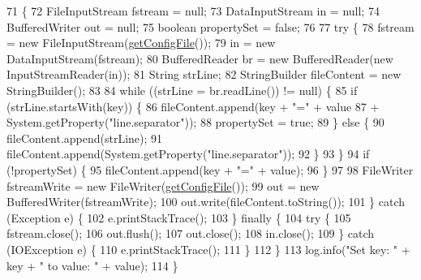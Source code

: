 \begin{DoxyCode}
71                                                              \{
72         FileInputStream fstream = null;
73         DataInputStream in = null;
74         BufferedWriter out = null;
75         \textcolor{keywordtype}{boolean} propertySet = \textcolor{keyword}{false};
76 
77         \textcolor{keywordflow}{try} \{
78             fstream = \textcolor{keyword}{new} FileInputStream(\hyperlink{classit_1_1isislab_1_1masonassisteddocumentation_1_1mason_1_1control_1_1_config_file_af791ff01652e95f6385641909b805e20}{getConfigFile}());
79             in = \textcolor{keyword}{new} DataInputStream(fstream);
80             BufferedReader br = \textcolor{keyword}{new} BufferedReader(\textcolor{keyword}{new} InputStreamReader(in));
81             String strLine;
82             StringBuilder fileContent = \textcolor{keyword}{new} StringBuilder();
83 
84             \textcolor{keywordflow}{while} ((strLine = br.readLine()) != null) \{
85                 \textcolor{keywordflow}{if} (strLine.startsWith(key)) \{
86                     fileContent.append(key + \textcolor{stringliteral}{"="} + value
87                             + System.getProperty(\textcolor{stringliteral}{"line.separator"}));
88                     propertySet = \textcolor{keyword}{true};
89                 \} \textcolor{keywordflow}{else} \{
90                     fileContent.append(strLine);
91                     fileContent.append(System.getProperty(\textcolor{stringliteral}{"line.separator"}));
92                 \}
93             \}
94             \textcolor{keywordflow}{if} (!propertySet) \{
95                 fileContent.append(key + \textcolor{stringliteral}{"="} + value);
96             \}
97 
98             FileWriter fstreamWrite = \textcolor{keyword}{new} FileWriter(\hyperlink{classit_1_1isislab_1_1masonassisteddocumentation_1_1mason_1_1control_1_1_config_file_af791ff01652e95f6385641909b805e20}{getConfigFile}());
99             out = \textcolor{keyword}{new} BufferedWriter(fstreamWrite);
100             out.write(fileContent.toString());
101         \} \textcolor{keywordflow}{catch} (Exception e) \{
102             e.printStackTrace();
103         \} \textcolor{keywordflow}{finally} \{
104             \textcolor{keywordflow}{try} \{
105                 fstream.close();
106                 out.flush();
107                 out.close();
108                 in.close();
109             \} \textcolor{keywordflow}{catch} (IOException e) \{
110                 e.printStackTrace();
111             \}
112         \}
113         log.info(\textcolor{stringliteral}{"Set key: "} + key + \textcolor{stringliteral}{" to value: "} + value);
114     \}
\end{DoxyCode}


